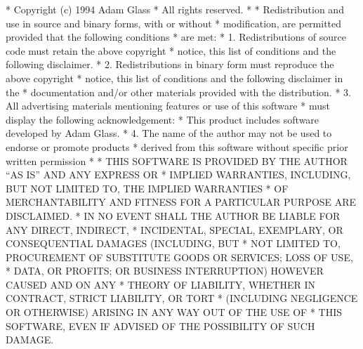 \begin{copyrightEnv}
 * Copyright (c) 1994 Adam Glass
 * All rights reserved.
 *
 * Redistribution and use in source and binary forms, with or without
 * modification, are permitted provided that the following conditions
 * are met:
 * 1. Redistributions of source code must retain the above copyright
 *    notice, this list of conditions and the following disclaimer.
 * 2. Redistributions in binary form must reproduce the above copyright
 *    notice, this list of conditions and the following disclaimer in the
 *    documentation and/or other materials provided with the distribution.
 * 3. All advertising materials mentioning features or use of this software
 *    must display the following acknowledgement:
 *      This product includes software developed by Adam Glass.
 * 4. The name of the author may not be used to endorse or promote products
 *    derived from this software without specific prior written permission
 *
 * THIS SOFTWARE IS PROVIDED BY THE AUTHOR ``AS IS'' AND ANY EXPRESS OR
 * IMPLIED WARRANTIES, INCLUDING, BUT NOT LIMITED TO, THE IMPLIED WARRANTIES
 * OF MERCHANTABILITY AND FITNESS FOR A PARTICULAR PURPOSE ARE DISCLAIMED.
 * IN NO EVENT SHALL THE AUTHOR BE LIABLE FOR ANY DIRECT, INDIRECT,
 * INCIDENTAL, SPECIAL, EXEMPLARY, OR CONSEQUENTIAL DAMAGES (INCLUDING, BUT
 * NOT LIMITED TO, PROCUREMENT OF SUBSTITUTE GOODS OR SERVICES; LOSS OF USE,
 * DATA, OR PROFITS; OR BUSINESS INTERRUPTION) HOWEVER CAUSED AND ON ANY
 * THEORY OF LIABILITY, WHETHER IN CONTRACT, STRICT LIABILITY, OR TORT
 * (INCLUDING NEGLIGENCE OR OTHERWISE) ARISING IN ANY WAY OUT OF THE USE OF
 * THIS SOFTWARE, EVEN IF ADVISED OF THE POSSIBILITY OF SUCH DAMAGE.
\end{copyrightEnv}

